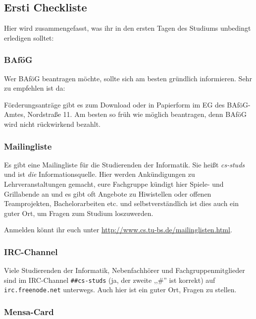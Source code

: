 \subsection{Ersti Checkliste}

Hier wird zusammengefasst, was ihr in den ersten Tagen des Studiums
unbedingt erledigen solltet:

\subsubsection{BAf\"oG}

Wer BAf\"oG beantragen m\"ochte, sollte sich am besten gr\"undlich
informieren. Sehr zu empfehlen ist da: \\
\mbox{}
 
F\"orderungsantr\"age gibt es zum Download oder in Papierform im
EG des BAf\"oG-Amtes, Nordstra\ss e 11. Am besten so fr\"uh
wie m\"oglich beantragen, denn BAf\"oG wird nicht r\"uckwirkend
bezahlt.

\subsubsection{Mailingliste}

Es gibt eine Mailingliste f\"ur die Studierenden der Informatik.
Sie hei\ss t \emph{cs-studs} und ist \emph{die} Informationsquelle.
Hier werden Ank\"undigungen zu Lehrveranstaltungen gemacht, eure
Fachgruppe k\"undigt hier Spiele- und Grillabende an und es gibt
oft Angebote zu Hiwistellen oder offenen Teamprojekten,
Bachelorarbeiten etc. und selbstverst\"andlich ist dies auch ein
guter Ort, um Fragen zum Studium loszuwerden.

Anmelden k\"onnt ihr euch unter
\url{http://www.cs.tu-bs.de/mailinglisten.html}.

\subsubsection{IRC-Channel}

Viele Studierenden der Informatik, Nebenfachh\"orer und
Fachgruppenmitglieder sind im IRC-Channel \texttt{\#\#cs-studs}
(ja, der zweite ,,\#'' ist korrekt) auf \texttt{irc.freenode.net}
unterwegs. Auch hier ist ein guter Ort, Fragen zu stellen.

\subsubsection{Mensa-Card}

